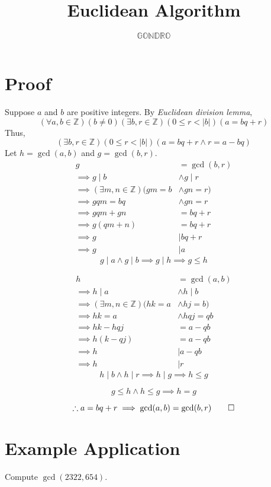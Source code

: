 \documentclass[a4paper]{article}
\author{\(\mathbb{GONDRO}\)}
\title{Euclidean Algorithm}
\begin{document}
\maketitle
\section{Proof}
Suppose \(a\) and \(b\) are positive integers.
By \emph{Euclidean division lemma},
\[(\forall a,b\in\mathbb Z)(b\ne0)(\exists b,r\in\mathbb Z)(0\leqslant r<|b|)(a=bq+r)\]
Thus,
\[(\exists b,r\in\mathbb Z)(0\leqslant r<|b|)(a=bq+r\land r=a-bq)\]
Let \(h=\gcd(a,b)\) and \(g=\gcd(b,r)\).
\[\begin{aligned}
    g&=\gcd(b,r)\\
    \implies g\mid b&\land g\mid r\\
    \implies (\exists m,n\in\mathbb Z)(gm=b&\land gn=r)\\
    \implies gqm=bq&\land gn=r\\
    \implies gqm+gn&=bq+r\\
    \implies g(qm+n)&=bq+r\\
    \implies g&\mid bq+r\\
    \implies g&\mid a
\end{aligned}\]
\[g\mid a\land g\mid b\implies g\mid h\implies g\leqslant h\]

\[\begin{aligned}
    h&=\gcd(a,b)\\
    \implies h\mid a&\land h\mid b\\
    \implies (\exists m,n\in\mathbb Z)(hk=a&\land hj=b)\\
    \implies hk=a&\land hqj=qb\\
    \implies hk-hqj&=a-qb\\
    \implies h(k-qj)&=a-qb\\
    \implies h&\mid a-qb\\
    \implies h&\mid r
\end{aligned}\]
\[h\mid b\land h\mid r\implies h\mid g\implies h\leqslant g\]

\[g\leqslant h\land h\leqslant g\implies h=g\]

\[\therefore a=bq+r\implies\gcd(a,b)=\gcd(b,r)\qed\]

\section{Example Application}
Compute \(\gcd(2322,654)\).
\end{document}
